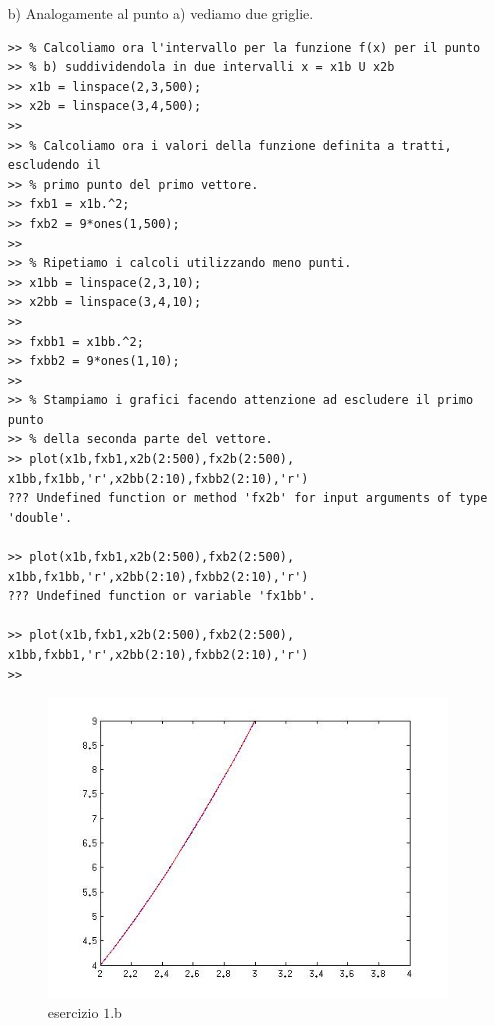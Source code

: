 \begin{enumerate}
\begin{svol}
\begin{itemize}
\item[b)]Analogamente al punto a) vediamo due griglie.
\begin{codice}
\begin{verbatim}
>> % Calcoliamo ora l'intervallo per la funzione f(x) per il punto
>> % b) suddividendola in due intervalli x = x1b U x2b
>> x1b = linspace(2,3,500);
>> x2b = linspace(3,4,500);
>> 
>> % Calcoliamo ora i valori della funzione definita a tratti, escludendo il
>> % primo punto del primo vettore.
>> fxb1 = x1b.^2;
>> fxb2 = 9*ones(1,500);
>> 
>> % Ripetiamo i calcoli utilizzando meno punti.
>> x1bb = linspace(2,3,10);
>> x2bb = linspace(3,4,10);
>> 
>> fxbb1 = x1bb.^2;
>> fxbb2 = 9*ones(1,10);
>> 
>> % Stampiamo i grafici facendo attenzione ad escludere il primo punto
>> % della seconda parte del vettore.
>> plot(x1b,fxb1,x2b(2:500),fx2b(2:500), x1bb,fx1bb,'r',x2bb(2:10),fxbb2(2:10),'r')
??? Undefined function or method 'fx2b' for input arguments of type 'double'.
 
>> plot(x1b,fxb1,x2b(2:500),fxb2(2:500), x1bb,fx1bb,'r',x2bb(2:10),fxbb2(2:10),'r')
??? Undefined function or variable 'fx1bb'.
 
>> plot(x1b,fxb1,x2b(2:500),fxb2(2:500), x1bb,fxbb1,'r',x2bb(2:10),fxbb2(2:10),'r')
>> 
\end{verbatim}
\end{codice}
\begin{figure}[!ht]\begin{center}
\includegraphics[scale=.50]{fig/es4-1b.jpg}\end{center}
\caption{esercizio $1$.b}
\end{figure}


\end{itemize}
\end{svol}
\end{enumerate}
